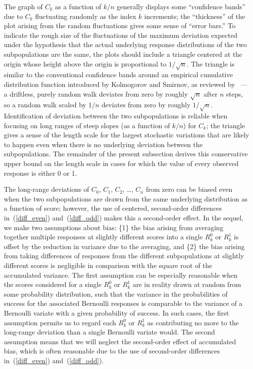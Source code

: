 \documentclass{article}
\begin{document}
The graph of $C_k$ as a function of $k/n$ generally displays
some ``confidence bands'' due to $C_k$ fluctuating randomly
as the index $k$ increments; the ``thickness'' of the plot
arising from the random fluctuations gives some sense of ``error bars.''
To indicate the rough size of the fluctuations
of the maximum deviation expected under the hypothesis that
the actual underlying response distributions of the two subpopulations
are the same, the plots should include a triangle centered at the origin
whose height above the origin is proportional to $1/\sqrt{n}$.
The triangle is similar to the conventional confidence bands
around an empirical cumulative distribution function
introduced by Kolmogorov and Smirnov, as reviewed by~\cite{doksum}
--- a driftless, purely random walk deviates from zero
by roughly $\sqrt{n}$ after $n$ steps, so a random walk scaled by $1/n$
deviates from zero by roughly $1/\sqrt{n}$.
Identification of deviation between the two subpopulations
is reliable when focusing on long ranges of steep slopes
(as a function of $k/n$) for $C_k$; the triangle gives a sense
of the length scale for the largest stochastic variations that
are likely to happen even when there is no underlying deviation
between the subpopulations. The remainder of the present subsection
derives this conservative upper bound on the length scale
in cases for which the value of every observed response is either 0 or 1.

The long-range deviations of $C_0$, $C_1$, $C_2$, \dots, $C_n$ from zero
can be biased even when the two subpopulations are drawn
from the same underlying distribution as a function of score;
however, the use of centered, second-order differences in~(\ref{diff_even})
and~(\ref{diff_odd}) makes this a second-order effect.
In the sequel, we make two assumptions about bias:
\{1\} the bias arising from averaging together multiple responses
at slightly different scores into a single $R^0_k$ or $R^1_k$ is offset
by the reduction in variance due to the averaging, and
\{2\} the bias arising from taking differences of responses
from the different subpopulations at slightly different scores
is negligible in comparison with the square root of the accumulated variance.
The first assumption can be especially reasonable when the scores
considered for a single $R^0_k$ or $R^1_k$
are in reality drawn at random from some probability distribution,
such that the variance in the probabilities of success
for the associated Bernoulli responses is comparable
to the variance of a Bernoulli variate with a given probability of success.
In such cases, the first assumption permits us to regard each $R^0_k$
or $R^1_k$ as contributing no more to the long-range deviation
than a single Bernoulli variate would.
The second assumption means that we will neglect
the second-order effect of accumulated bias,
which is often reasonable due to the use of second-order differences
in~(\ref{diff_even}) and~(\ref{diff_odd}).
\end{document}
